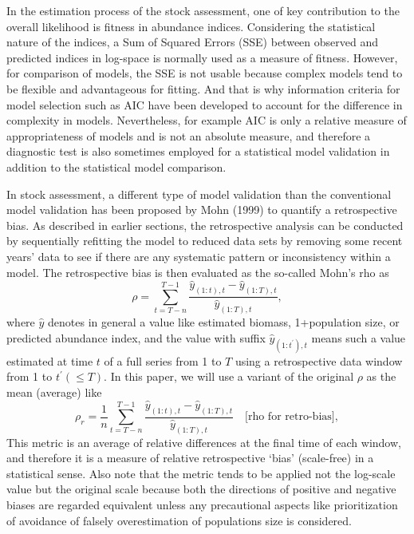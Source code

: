 \documentclass[a4paper]{article}
\newcommand{\disp}{\displaystyle}
\begin{document}
\baselineskip=14pt

In the estimation process of the stock assessment, one of key contribution to the overall likelihood is fitness in abundance indices. Considering the statistical nature of the indices, a Sum of Squared Errors (SSE) between observed and predicted indices in log-space is normally used as a measure of fitness. However, for comparison of models, the SSE is not usable because complex models tend to be flexible and advantageous for fitting. And that is why information criteria for model selection such as AIC have been developed to account for the difference in complexity in models. Nevertheless, for example AIC is only a relative measure of appropriateness of models and is not an absolute measure, and therefore a diagnostic test is also sometimes employed for a statistical model validation in addition to the statistical model comparison. 

In stock assessment, a different type of model validation than the conventional model validation has been proposed by Mohn (1999) to quantify a retrospective bias. As described in earlier sections, the retrospective analysis can be conducted by sequentially refitting the model to reduced data sets by removing some recent years' data to see if there are any systematic pattern or inconsistency within a model. The retrospective bias is then evaluated as the so-called Mohn's rho as 
\[
\rho = \disp \sum_{t=T-n}^{T-1} \frac{\hat{y}_{(1:t),t}-\hat{y}_{(1:T),t}}{\hat{y}_{(1:T),t}}, 
\]
where $\hat{y}$ denotes in general a value like estimated biomass, 1+population size, or predicted abundance index, and the value with suffix $\hat{y}_{(1:t^\prime),t}$ means such a value estimated at time $t$ of a full series from 1 to $T$ using a retrospective data window from 1 to $t^\prime (\leq T)$. In this paper, we will use a variant of the original $\rho$ as the mean (average) like 
\begin{equation}
\rho_r = \disp \frac{1}{n} \sum_{t=T-n}^{T-1} \frac{\hat{y}_{(1:t),t}-\hat{y}_{(1:T),t}}{\hat{y}_{(1:T),t}} 
\quad \mbox{[rho for retro-bias]}, 
\end{equation}
This metric is an average of relative differences at the final time of each window, and therefore it is a measure of relative retrospective `bias' (scale-free) in a statistical sense. Also note that the metric tends to be applied not the log-scale value but the original scale because both the directions of positive and negative biases are regarded equivalent unless any precautional aspects like prioritization of avoidance of falsely overestimation of populations size is considered. 
\end{document}

